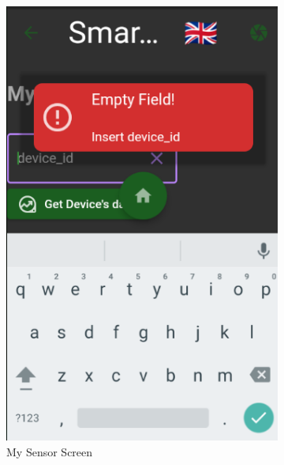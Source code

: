 \documentclass[a4paper,12pt]{report}
\begin{document}
\begin{figure}[H]	
	\begin{subfigure}{0.3\textwidth}
		\includegraphics[width=\textwidth]{./images/my_sensor/my_sensor_screen.png}
		\caption{My Sensor Screen}
		\label{fig:my_sensor}
	\end{subfigure}
	\hfill
	\begin{subfigure}{0.3\textwidth}

\end{subfigure}
\end{figure}
\end{document}
